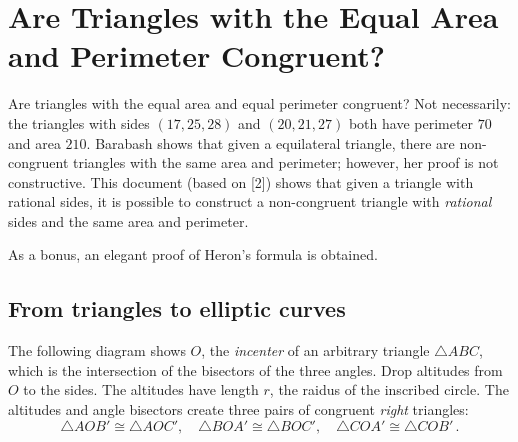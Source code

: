 
\chapter{Are Triangles with the Equal Area and Perimeter Congruent?}\label{c.congruent}

Are triangles with the equal area and equal perimeter congruent? Not necessarily: the triangles with sides $(17,25,28)$ and $(20,21,27)$ both have perimeter $70$ and area $210$. Barabash \cite{marita} shows that given a equilateral triangle, there are non-congruent triangles with the same area and perimeter; however, her proof is not constructive. This document (based on [2]) shows that given a triangle with rational sides, it is possible to construct a non-congruent triangle with \emph{rational} sides and the same area and perimeter.

As a bonus, an elegant proof of Heron's formula is obtained.

\vspace{-2ex}

\section{From triangles to elliptic curves}

The following diagram shows $O$, the \emph{incenter} of an arbitrary triangle $\triangle ABC$, which is the intersection of the bisectors of the three angles.  Drop altitudes from $O$ to the sides. The altitudes have length $r$, the raidus of the inscribed circle. The altitudes and angle bisectors create three pairs of congruent \emph{right} triangles:
\[
\triangle AOB'\cong \triangle AOC',\quad \triangle BOA'\cong \triangle BOC',\quad \triangle COA'\cong \triangle COB'\,.
\]

\vspace*{-6ex}

